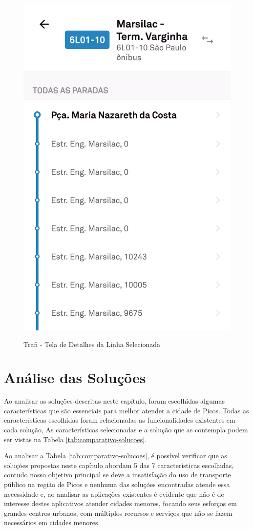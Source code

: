\begin{figure}[H]
\caption{Trafi - Tela de Detalhes da Linha Selecionada}
\centering
\includegraphics[width=.4\textwidth]{imagens/traffi.png}
\label{fig:trafi}
\end{figure}

\section{Análise das Soluções}

Ao analisar as soluções descritas neste capítulo, foram escolhidas algumas características que são essenciais para melhor atender a cidade de Picos. Todas as características escolhidas foram relacionadas as funcionalidades existentes em cada solução, As características selecionadas e a solução que as contempla podem ser vistas na Tabela \ref{tab:comparativo-solucoes}.

Ao analisar a Tabela \ref{tab:comparativo-solucoes}, é possível verificar que as soluções propostas neste capítulo abordam 5 das 7 características escolhidas, contudo nosso objetivo principal se deve a insatisfação do uso de transporte público na região de Picos e nenhuma das soluções encontradas atende essa necessidade e, ao analisar as aplicações existentes é evidente que não é de interesse destes aplicativos atender cidades menores, focando seus esforços em grandes centros urbanos, com múltiplos recursos e serviços que não se fazem necessários em cidades menores.

